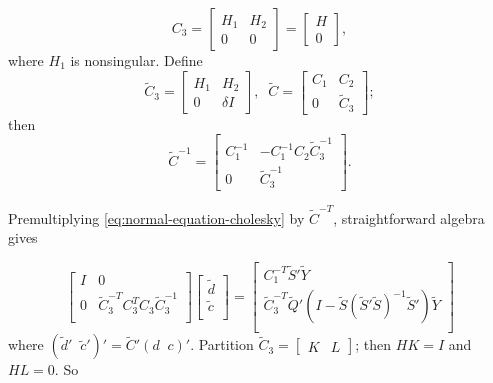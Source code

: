 \documentclass[12pt]{article}
\newcommand{\tildeS}{\tilde{S}}
\newcommand{\tildeY}{\tilde{Y}}
\newcommand{\tildeQ}{\tilde{Q}}
\theoremstyle{definition}
\begin{document}
\begin{equation*}
C_3 = \begin{bmatrix} H_1 & H_2 \\ 0 & 0 \end{bmatrix} = \begin{bmatrix} H \\  0 \end{bmatrix},
\end{equation*}
\noindent
where $H_1$ is nonsingular. Define
\begin{equation} \label{eq:cholesky-factor-mod}
\tilde{C}_3 = \begin{bmatrix}
H_1 & H_2 \\
0  & \delta I 
\end{bmatrix}, \;\;
\tilde{C} = \begin{bmatrix}
C_1 & C_2 \\
0  & \tilde{C}_3 
\end{bmatrix};
\end{equation}
\noindent
then
\begin{equation} \label{eq:cholesky-factor-mod-inverse}
\tilde{C}^{-1} = \begin{bmatrix}
C_1^{-1} & -C_1^{-1} C_2 \tilde{C}_3^{-1} \\
0  & \tilde{C}_3^{-1}
\end{bmatrix}.
\end{equation}

Premultiplying \ref{eq:normal-equation-cholesky} by $\tilde{C}^{-T}$, straightforward algebra gives 

\begin{equation} \label{eq:vectorized-normal-equations-cholesky}
\begin{bmatrix}
I & 0 \\
0 & \tilde{C}_3^{-T} C_3^{T} C_3 \tilde{C}_3^{-1}\\
\end{bmatrix}
\begin{bmatrix}
\tilde{d}\\
\tilde{c}\\
\end{bmatrix}
= \begin{bmatrix}
C_1^{-T} \tildeS'\tildeY \\
\tilde{C}_3^{-T} \tildeQ'\left( I - \tildeS\left( \tildeS' \tildeS \right)^{-1} \tildeS' \right) \tildeY\\
\end{bmatrix}
\end{equation}
\noindent
where $\left( \tilde{d}'\;\;\tilde{c}' \right)' =  \tilde{C}' \left( d\;\;c \right)'$. Partition $\tilde{C}_3 = \begin{bmatrix} K &  L\end{bmatrix}$; then $HK = I$ and $HL = 0$. So
\end{document}
